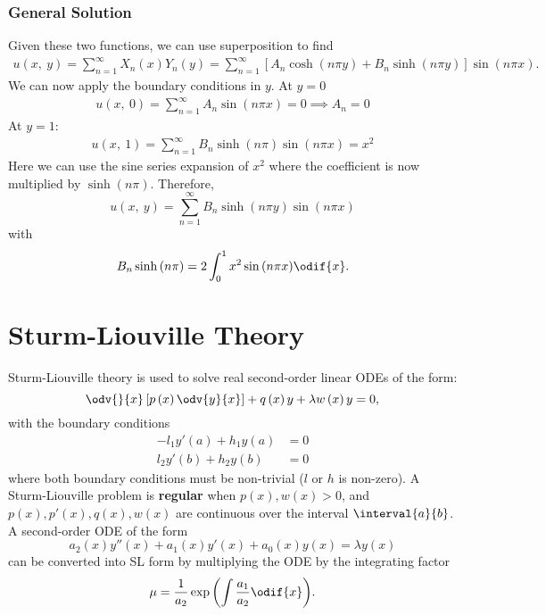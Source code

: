 \documentclass{article}
\begin{document}
\subsubsection{General Solution}
Given these two functions, we can use superposition to find
\begin{align*}
    u\left( x,\: y \right) = \sum_{n = 1}^\infty X_n\left( x \right) Y_n\left( y \right) = \sum_{n = 1}^\infty \left[ A_n \cosh{\left( n \pi y \right)} + B_n \sinh{\left( n \pi y \right)} \right] \sin{\left( n \pi x \right)}.
\end{align*}
We can now apply the boundary conditions in \(y\). At \(y = 0\)
\begin{align*}
    u\left( x,\: 0 \right) = \sum_{n = 1}^\infty A_n \sin{\left( n \pi x \right)} = 0 \implies A_n = 0
\end{align*}
At \(y = 1\):
\begin{align*}
    u\left( x,\: 1 \right) = \sum_{n = 1}^\infty B_n \sinh{\left( n \pi \right)} \sin{\left( n \pi x \right)} = x^2
\end{align*}
Here we can use the sine series expansion of \(x^2\) where the coefficient is now multiplied by \(\sinh{\left( n \pi \right)}\).
Therefore,
\begin{equation*}
    u\left( x,\: y \right) = \sum_{n = 1}^\infty B_n \sinh{\left( n \pi y \right)} \sin{\left( n \pi x \right)}
\end{equation*}
with
\begin{equation*}
    B_n \sinh{\left( n \pi \right)} = 2 \int_0^1 x^2 \sin{\left( n \pi x \right)} \odif{x}.
\end{equation*}
\section{Sturm-Liouville Theory}
Sturm-Liouville theory is used to solve real second-order linear ODEs
of the form:
\begin{equation*}
    \odv{}{x} \left[ p\left( x \right) \odv{y}{x} \right] + q\left( x \right) y + \lambda w\left( x \right) y = 0,
\end{equation*}
with the boundary conditions
\begin{align*}
    -l_1 y'\left( a \right) + h_1 y\left( a \right) & = 0 \\
    l_2 y'\left( b \right) + h_2 y\left( b \right)  & = 0
\end{align*}
where both boundary conditions must be non-trivial (\(l\) or \(h\) is non-zero). A Sturm-Liouville problem is
\textbf{regular} when \(p\left( x \right), w\left( x \right) > 0\), and \(p\left( x \right), p'\left( x \right), q\left( x \right), w\left( x \right)\) are continuous
over the interval \(\interval{a}{b}\).
A second-order ODE of the form
\begin{equation*}
    a_2\left( x \right) y''\left( x \right) + a_1\left( x \right) y'\left( x \right) + a_0\left( x \right) y\left( x \right) = \lambda y\left( x \right)
\end{equation*}
can be converted into SL form by multiplying the ODE by the integrating factor
\begin{equation*}
    \mu = \frac{1}{a_2} \exp{\left( \int \frac{a_1}{a_2} \odif{x} \right)}.
\end{equation*}
\end{document}
